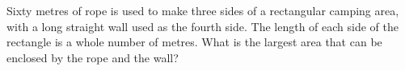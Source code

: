 Sixty metres of rope is used to make three sides of a rectangular camping area, with a long straight wall used as the fourth side. The length of each side of the rectangle is a whole number of metres. What is the largest area that can be enclosed by the rope and the wall?
